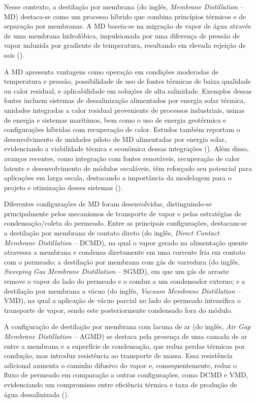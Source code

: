 Nesse contexto, a destilação por membrana (do inglês, \textit{Membrane Distillation} -- MD) destaca-se como um processo híbrido que combina princípios térmicos e de separação por membranas. A MD baseia-se na migração de vapor de água através de uma membrana hidrofóbica, impulsionada por uma diferença de pressão de vapor induzida por gradiente de temperatura, resultando em elevada rejeição de sais (\cite{Abid2020DesalinationOverview,Cath2010}).

A MD apresenta vantagens como operação em condições moderadas de temperatura e pressão, possibilidade de uso de fontes térmicas de baixa qualidade ou calor residual, e aplicabilidade em soluções de alta salinidade. Exemplos dessas fontes incluem sistemas de dessalinização alimentados por energia solar térmica, unidades integradas a calor residual proveniente de processos industriais, usinas de energia e sistemas marítimos, bem como o uso de energia geotérmica e configurações híbridas com recuperação de calor. Estudos também reportam o desenvolvimento de unidades piloto de MD alimentadas por energia solar, evidenciando a viabilidade técnica e econômica dessas integrações (\cite{Yadav2021MDLowGradeEnergy}). Além disso, avanços recentes, como integração com fontes renováveis, recuperação de calor latente e desenvolvimento de módulos escaláveis, têm reforçado seu potencial para aplicações em larga escala, destacando a importância da modelagem para o projeto e otimização desses sistemas (\cite{Cath2010,Leaper2021,Warsinger2017,Parani2021,AndresManas2022}).

Diferentes configurações de MD foram desenvolvidas, distinguindo-se principalmente pelos mecanismos de transporte de vapor e pelas estratégias de condensação/coleta do permeado. Entre as principais configurações, destacam-se a destilação por membrana de contato direto (do inglês, \textit{Direct Contact Membrane Distillation} -- DCMD), na qual o vapor gerado na alimentação quente atravessa a membrana e condensa diretamente em uma corrente fria em contato com o permeado; a destilação por membrana com gás de varredura (do inglês, \textit{Sweeping Gas Membrane Distillation} -- SGMD), em que um gás de arraste remove o vapor do lado do permeado e o conduz a um condensador externo; e a destilação por membrana a vácuo (do inglês, \textit{Vacuum Membrane Distillation} -- VMD), na qual a aplicação de vácuo parcial no lado do permeado intensifica o transporte de vapor, sendo este posteriormente condensado fora do módulo.

A configuração de destilação por membrana com lacuna de ar (do inglês, \textit{Air Gap Membrane Distillation} -- AGMD) se destaca pela presença de uma camada de ar entre a membrana e a superfície de condensação, que reduz perdas térmicas por condução, mas introduz resistência ao transporte de massa. Essa resistência adicional aumenta o caminho difusivo do vapor e, consequentemente, reduz o fluxo de permeado em comparação a outras configurações, como DCMD e VMD, evidenciando um compromisso entre eficiência térmica e taxa de produção de água dessalinizada (\cite{AlZoubi2018,Chong2022,Abid2020DesalinationOverview}).

